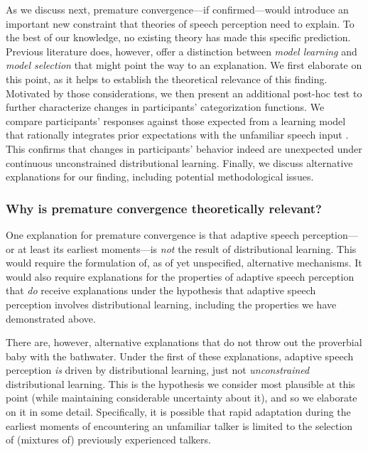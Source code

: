 \documentclass[
  11pt,
  man,mask,floatsintext]{apa6}
\begin{document}
As we discuss next, premature convergence---if confirmed---would introduce an important new constraint that theories of speech perception need to explain. To the best of our knowledge, no existing theory has made this specific prediction. Previous literature does, however, offer a distinction between \emph{model learning} and \emph{model selection} that might point the way to an explanation. We first elaborate on this point, as it helps to establish the theoretical relevance of this finding. Motivated by those considerations, we then present an additional post-hoc test to further characterize changes in participants' categorization functions. We compare participants' responses against those expected from a learning model that rationally integrates prior expectations with the unfamiliar speech input \autocite[as opposed to an idealized learner that already \emph{knows} the solution, cf.~the distinction between ideal, and ideal\emph{ized}, learning models in][]{qian2012}. This confirms that changes in participants' behavior indeed are unexpected under continuous unconstrained distributional learning. Finally, we discuss alternative explanations for our finding, including potential methodological issues.

\subsubsection{Why is premature convergence theoretically relevant?}\label{why-is-premature-convergence-theoretically-relevant}

One explanation for premature convergence is that adaptive speech perception---or at least its earliest moments---is \emph{not} the result of distributional learning. This would require the formulation of, as of yet unspecified, alternative mechanisms. It would also require explanations for the properties of adaptive speech perception that \emph{do} receive explanations under the hypothesis that adaptive speech perception involves distributional learning, including the properties we have demonstrated above.

There are, however, alternative explanations that do not throw out the proverbial baby with the bathwater. Under the first of these explanations, adaptive speech perception \emph{is} driven by distributional learning, just not \emph{unconstrained} distributional learning. This is the hypothesis we consider most plausible at this point (while maintaining considerable uncertainty about it), and so we elaborate on it in some detail. Specifically, it is possible that rapid adaptation during the earliest moments of encountering an unfamiliar talker is limited to the selection of (mixtures of) previously experienced talkers.
\end{document}
